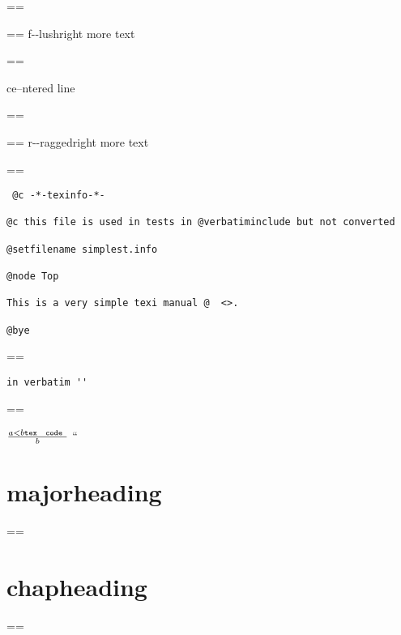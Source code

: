 \documentclass{book}
\makeatletter
\newenvironment{Texinfopreformatted}{%
  \par\GNUTobeylines\obeyspaces\frenchspacing\parskip=\z@\parindent=\z@}{}
{\catcode`\^^M=13 \gdef\GNUTobeylines{\catcode`\^^M=13 \def^^M{\null\par}}}
\newenvironment{Texinfoindented}{\begin{list}{}{}\item\relax}{\end{list}}
\newcommand{\Texinfoplaceholder}[1]{}
\newcommand{\Texinfonopagebreakheading}[2]{{\let\clearpage\relax \let\cleardoublepage\relax \let\thispagestyle\Texinfoplaceholder #1{#2}}}
\renewcommand{\_}{\Texinfounderscore\discretionary{}{}{}}
\makeatother
\begin{document}
\begin{Texinfoindented}
\begin{flushright}
\begin{Texinfopreformatted}
\begin{Texinfopreformatted}%
\ttfamily f{-}{-}lushright
more text
\end{Texinfopreformatted}
\end{Texinfopreformatted}
\end{flushright}
\begin{Texinfopreformatted}%
\ttfamily 
\end{Texinfopreformatted}
\begin{center}
ce--ntered line
\end{center}
\begin{Texinfopreformatted}%
\ttfamily 
\end{Texinfopreformatted}
\begin{flushleft}
\begin{Texinfopreformatted}%
\ttfamily r{-}{-}raggedright
more text
\end{Texinfopreformatted}
\end{flushleft}
\begin{Texinfopreformatted}%
\ttfamily 
\end{Texinfopreformatted}
\begin{verbatim}
 @c -*-texinfo-*-

@c this file is used in tests in @verbatiminclude but not converted

@setfilename simplest.info

@node Top

This is a very simple texi manual @  <>.

@bye
\end{verbatim}
\begin{Texinfopreformatted}%
\ttfamily 
\end{Texinfopreformatted}
\begin{verbatim}
in verbatim ''
\end{verbatim}
\begin{Texinfopreformatted}%
\ttfamily 




$\frac{a < b \texttt{tex \hbox{ code }}}{b}$ ``

\end{Texinfopreformatted}
\Texinfonopagebreakheading{\chapter*}{{majorheading}}
\begin{Texinfopreformatted}%
\ttfamily 
\end{Texinfopreformatted}
\Texinfonopagebreakheading{\chapter*}{{chapheading}}
\begin{Texinfopreformatted}%
\ttfamily 
\end{Texinfopreformatted}

\end{Texinfoindented}
\end{document}
